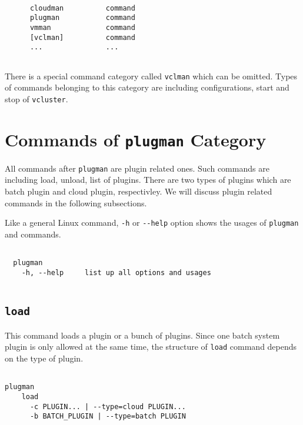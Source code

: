 \documentclass[11pt]{article}
\def \ttt{\texttt}
\def \vb{\verb}
\begin{document}
\begin{Verbatim}[fontfamily=courier, fontsize = \small, obeytabs
=true, tabsize=4, frame=lines]

      cloudman          command
      plugman           command
      vmman             command
      [vclman]          command
      ...               ...
  
\end{Verbatim}

There is a special command category called \vb+vclman+ which can be omitted. Types of commands belonging to this category are including configurations, start and stop of \vb+vcluster+.


\section{Commands of \ttt{plugman} Category}

All commands after \vb+plugman+ are plugin related ones. Such commands are including load, unload, list of plugins. There are two types of plugins which are batch plugin and cloud plugin, respectivley. We will discuss plugin related commands in the following subsections.

Like a general Linux command, \vb+-h+ or \vb+--help+ option shows the usages of \vb+plugman+ and commands.

\begin{Verbatim}[fontfamily=courier, fontsize = \small, obeytabs
=true, tabsize=4, frame=lines]

  plugman 
    -h, --help     list up all options and usages
  
\end{Verbatim}


\subsection{\ttt{load}}
This command loads a plugin or a bunch of plugins. Since one batch system plugin is only allowed at the same time, the structure of \vb+load+ command depends on the type of plugin.  

\begin{Verbatim}[fontfamily=courier, fontsize = \small, obeytabs
=true, tabsize=4, frame=lines]

plugman 
    load
      -c PLUGIN... | --type=cloud PLUGIN... 
      -b BATCH_PLUGIN | --type=batch PLUGIN
      
\end{Verbatim}
\end{document}
